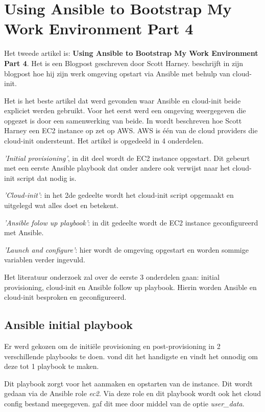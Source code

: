 \newpage

\section{Using Ansible to Bootstrap My Work Environment Part 4}
Het tweede artikel is: \textbf{Using Ansible to Bootstrap My Work Environment Part 4}. Het is een Blogpost geschreven door Scott Harney. \autocite{scottharney} beschrijft in zijn blogpost hoe hij zijn werk omgeving opstart via Ansible met behulp van cloud-init. 


Het is het beste artikel dat werd gevonden waar Ansible en cloud-init beide expliciet werden gebruikt. Voor het eerst werd een omgeving weergegeven die opgezet is door een samenwerking van beide. In \autocite{scottharney} wordt beschreven hoe Scott Harney een EC2 instance op zet op AWS. AWS is één van de cloud providers die cloud-init ondersteunt. Het artikel is opgedeeld in 4 onderdelen. 

\textit{'Initial provisioning'}, in dit deel wordt de EC2 instance opgestart. Dit gebeurt met een eerste Ansible playbook dat onder andere ook verwijst naar het cloud-init script dat nodig is. 

\textit{'Cloud-init'}: in het 2de gedeelte wordt het cloud-init script opgemaakt en uitgelegd wat alles doet en betekent. 

\textit{'Ansible folow up playbook'}: in dit gedeelte wordt de EC2 instance geconfigureerd met Ansible. 

\textit{'Launch and configure'}: hier wordt de omgeving opgestart en worden sommige variablen verder ingevuld.

Het literatuur onderzoek zal over de eerste 3 onderdelen gaan: initial provisioning, cloud-init en Ansible follow up playbook. Hierin worden Ansible en cloud-init besproken en geconfigureerd.

\subsection{Ansible initial playbook}
Er werd gekozen om de initiële provisioning en post-provisioning in 2 verschillende playbooks te doen. \autocite{scottharney} vond dit het handigste en vindt het onnodig om deze tot 1 playbook te maken. 

Dit playbook zorgt voor het aanmaken en opstarten van de instance. Dit wordt gedaan via de Ansible role \textit{ec2}. Via deze role en dit playbook wordt ook het cloud config bestand meegegeven. \autocite{scottharney} gaf dit mee door middel van de optie \textit{user\_data}. 

